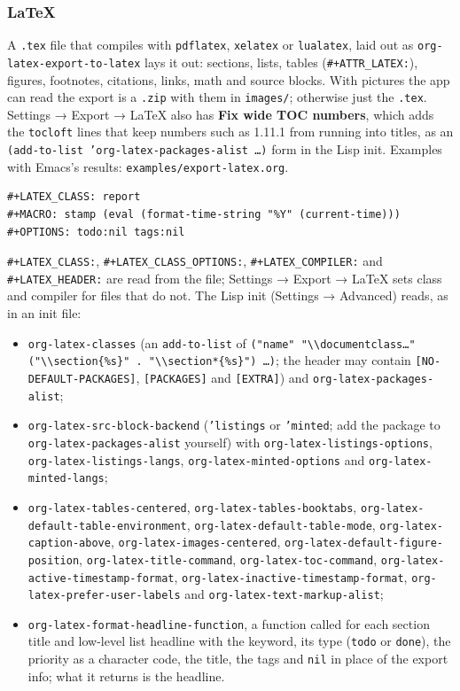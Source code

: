 \documentclass[11pt]{article}
\begin{document}
\subsubsection{\LaTeX{}}
\label{sec:org3a50d8d}

A \texttt{.tex} file that compiles with \texttt{pdflatex}, \texttt{xelatex} or \texttt{lualatex}, laid out as \texttt{org-latex-export-to-latex} lays it out: sections, lists, tables (\texttt{\#+ATTR\_LATEX:}), figures, footnotes, citations, links, math and source blocks. With pictures the app can read the export is a \texttt{.zip} with them in \texttt{images/}; otherwise just the \texttt{.tex}. Settings → Export → \LaTeX{} also has \textbf{Fix wide TOC numbers}, which adds the \texttt{tocloft} lines that keep numbers such as 1.11.1 from running into titles, as an \texttt{(add-to-list 'org-latex-packages-alist …)} form in the Lisp init. Examples with Emacs's results: \texttt{examples/export-latex.org}.

\begin{verbatim}
#+LATEX_CLASS: report
#+MACRO: stamp (eval (format-time-string "%Y" (current-time)))
#+OPTIONS: todo:nil tags:nil
\end{verbatim}

\texttt{\#+LATEX\_CLASS:}, \texttt{\#+LATEX\_CLASS\_OPTIONS:}, \texttt{\#+LATEX\_COMPILER:} and \texttt{\#+LATEX\_HEADER:} are read from the file; Settings → Export → \LaTeX{} sets class and compiler for files that do not. The Lisp init (Settings → Advanced) reads, as in an init file:
\begin{itemize}
\item \texttt{org-latex-classes} (an \texttt{add-to-list} of \texttt{("name" "\textbackslash{}\textbackslash{}documentclass…" ("\textbackslash{}\textbackslash{}section\{\%s\}" . "\textbackslash{}\textbackslash{}section*\{\%s\}") …)}; the header may contain \texttt{[NO-DEFAULT-PACKAGES]}, \texttt{[PACKAGES]} and \texttt{[EXTRA]}) and \texttt{org-latex-packages-alist};
\item \texttt{org-latex-src-block-backend} (\texttt{'listings} or \texttt{'minted}; add the package to \texttt{org-latex-packages-alist} yourself) with \texttt{org-latex-listings-options}, \texttt{org-latex-listings-langs}, \texttt{org-latex-minted-options} and \texttt{org-latex-minted-langs};
\item \texttt{org-latex-tables-centered}, \texttt{org-latex-tables-booktabs}, \texttt{org-latex-default-table-environment}, \texttt{org-latex-default-table-mode}, \texttt{org-latex-caption-above}, \texttt{org-latex-images-centered}, \texttt{org-latex-default-figure-position}, \texttt{org-latex-title-command}, \texttt{org-latex-toc-command}, \texttt{org-latex-active-timestamp-format}, \texttt{org-latex-inactive-timestamp-format}, \texttt{org-latex-prefer-user-labels} and \texttt{org-latex-text-markup-alist};
\item \texttt{org-latex-format-headline-function}, a function called for each section title and low-level list headline with the keyword, its type (\texttt{todo} or \texttt{done}), the priority as a character code, the title, the tags and \texttt{nil} in place of the export info; what it returns is the headline.
\end{itemize}
\end{document}
